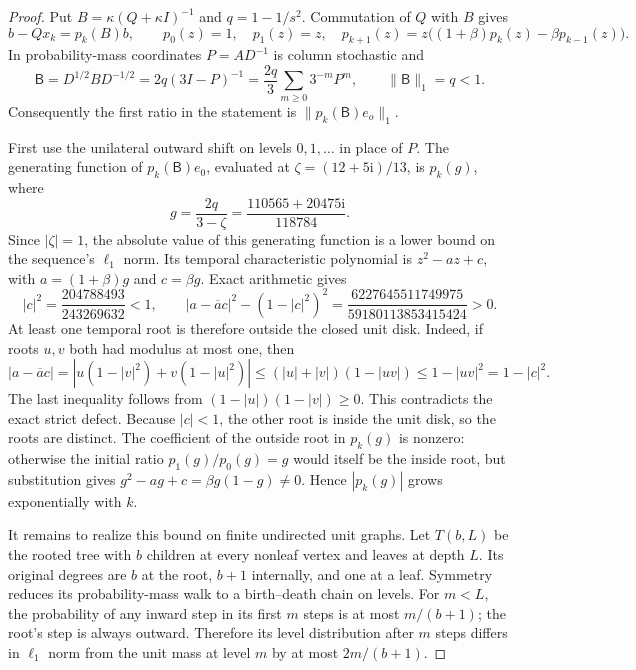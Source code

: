 \begin{proof}
Put $B=\kappa(Q+\kappa I)^{-1}$ and $q=1-1/s^2$.
Commutation of $Q$ with $B$ gives
\[
 b-Qx_k=p_k(B)b,\qquad p_0(z)=1,\quad p_1(z)=z,\quad
 p_{k+1}(z)=z\bigl((1+\beta)p_k(z)-\beta p_{k-1}(z)\bigr).
\]
In probability-mass coordinates $P=AD^{-1}$ is column stochastic and
\begin{equation}
 \mathsf B=D^{1/2}BD^{-1/2}
       =2q(3I-P)^{-1}
       =\frac{2q}{3}\sum_{m\geq0}3^{-m}P^m,
 \qquad \|\mathsf B\|_1=q<1.
 \label{eq:revisit-aesp-resolvent}
\end{equation}
Consequently the first ratio in the statement is
$\|p_k(\mathsf B)e_o\|_1$.

First use the unilateral outward shift on levels $0,1,\ldots$ in place
of $P$. The generating function of $p_k(\mathsf B)e_0$, evaluated at
$\zeta=(12+5\mathrm i)/13$, is $p_k(g)$, where
\[
 g=\frac{2q}{3-\zeta}
   =\frac{110565+20475\mathrm i}{118784}.
\]
Since $|\zeta|=1$, the absolute value of this generating function is a
lower bound on the sequence's $\ell_1$ norm. Its temporal characteristic
polynomial is $z^2-a z+c$, with $a=(1+\beta)g$ and $c=\beta g$.
Exact arithmetic gives
\[
 |c|^2=\frac{204788493}{243269632}<1,\qquad
 |a-\overline a c|^2-(1-|c|^2)^2
   =\frac{6227645511749975}{59180113853415424}>0.
\]
At least one temporal root is therefore outside the closed unit disk.
Indeed, if roots $u,v$ both had modulus at most one, then
\[
 |a-\overline a c|
 =|u(1-|v|^2)+v(1-|u|^2)|
 \leq(|u|+|v|)(1-|uv|)\leq1-|uv|^2=1-|c|^2.
\]
The last inequality follows from
$(1-|u|)(1-|v|)\geq0$. This contradicts the exact strict defect.
Because $|c|<1$, the other root is inside the unit disk, so the roots
are distinct. The coefficient of the outside root in $p_k(g)$ is
nonzero: otherwise the initial ratio $p_1(g)/p_0(g)=g$ would itself
be the inside root, but substitution gives
$g^2-a g+c=\beta g(1-g)\ne0$.
Hence $|p_k(g)|$ grows exponentially with $k$.

It remains to realize this bound on finite undirected unit graphs.
Let $T(b,L)$ be the rooted tree with $b$ children at every nonleaf
vertex and leaves at depth $L$. Its original degrees are $b$ at the
root, $b+1$ internally, and one at a leaf. Symmetry reduces its
probability-mass walk to a birth--death chain on levels. For $m<L$, the
probability of any inward step in its first $m$ steps is at most
$m/(b+1)$; the root's step is always outward. Therefore its level
distribution after $m$ steps differs in $\ell_1$ norm from the unit
mass at level $m$ by at most $2m/(b+1)$.


\end{proof}
